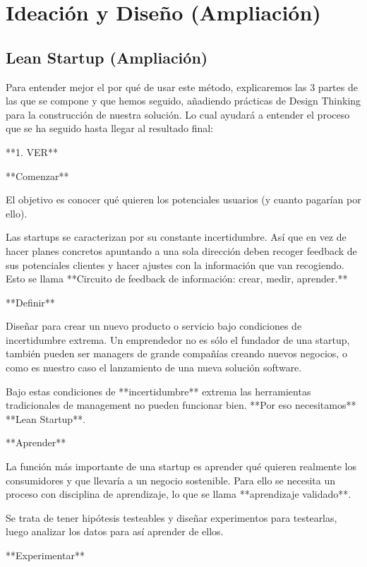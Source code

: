 \documentclass[12pt,twoside,titlepage]{report}
\begin{document}
\chapter{Ideación y Diseño (Ampliación)}

\section{Lean Startup (Ampliación)}
\label{sec:apendice}

Para entender mejor el por qué de usar este método, explicaremos las 3 partes de las que se compone y que hemos seguido, añadiendo prácticas de Design Thinking para la construcción de nuestra solución. Lo cual ayudará a entender el proceso que se ha seguido hasta llegar al resultado final:

**1. VER**

**Comenzar**

El objetivo es conocer qué quieren los potenciales usuarios (y cuanto pagarían por ello). 

Las startups se caracterizan por su constante incertidumbre. Así que en vez de hacer planes concretos apuntando a una sola dirección deben recoger feedback de sus potenciales clientes y hacer ajustes con la información que van recogiendo. Esto se llama **Circuito de feedback de información: crear, medir, aprender.** 

**Definir**

Diseñar para crear un nuevo producto o servicio bajo condiciones de incertidumbre extrema. Un emprendedor no es sólo el fundador de una startup, también pueden ser managers de grande compañías creando nuevos negocios, o como es nuestro caso el lanzamiento de una nueva solución software.

Bajo estas condiciones de **incertidumbre** extrema las herramientas tradicionales de management no pueden funcionar bien. **Por eso necesitamos** **Lean Startup**.

**Aprender**

La función más importante de una startup es aprender qué quieren realmente los consumidores y que llevaría a un negocio sostenible. Para ello se necesita un proceso con disciplina de aprendizaje, lo que se llama **aprendizaje validado**. 

Se trata de tener hipótesis testeables y diseñar experimentos para testearlas, luego analizar los datos para así aprender de ellos.

**Experimentar**
\end{document}
